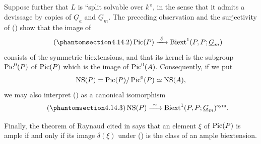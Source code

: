 Suppose further that $L$ is ``split solvable over $k$'', in the
sense that it admits a devissage by copies of $\underline G_a$ and
$\underline G_m$.  The preceding observation and the surjectivity of
() show that the image of
\begin{equation}\tag{\SGARefTarget{sga7.sga7i.eviii.n4-14-2}{4.14.2}}
 \Pic(P)\xrightarrow{\ \delta\ }
 \Biext^1(P,P;\underline G_m)
\end{equation}
consists of the symmetric biextensions, and that its kernel is the
subgroup $\operatorname{Pic}^0(P)$ of $\operatorname{Pic}(P)$ which is the image of $\operatorname{Pic}^0(A)$.
Consequently, if we put
\[
 \operatorname{NS}(P)=\operatorname{Pic}(P)/\operatorname{Pic}^0(P)
 \simeq\operatorname{NS}(A),
\]
we may also interpret () as a canonical isomorphism
\begin{equation}\tag{\SGARefTarget{sga7.sga7i.eviii.n4-14-3}{4.14.3}}
 \operatorname{NS}(P)
 \xrightarrow{\ \sim\ }
 \Biext^1(P,P;\underline G_m)^{\mathrm{sym}}.
\end{equation}

Finally, the theorem of Raynaud cited in  says that an element
$\xi$ of $\operatorname{Pic}(P)$ is ample if and only if its image
$\delta(\xi)$ under () is the class of an ample biextension.
